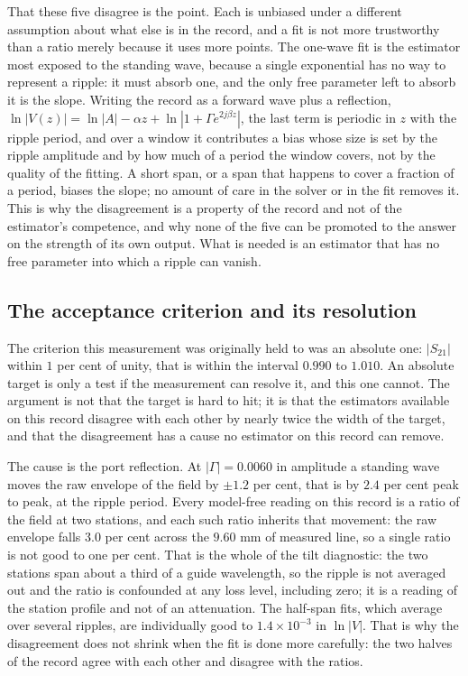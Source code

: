 That these five disagree is the point. Each is unbiased under a different assumption about what else is in the
record, and a fit is not more trustworthy than a ratio merely because it uses more points. The one-wave fit is
the estimator most exposed to the standing wave, because a single exponential has no way to represent a
ripple: it must absorb one, and the only free parameter left to absorb it is the slope. Writing the record as
a forward wave plus a reflection, $\ln|V(z)| = \ln|A| - \alpha z + \ln|1+\Gamma e^{2j\beta z}|$, the last
term is periodic in $z$ with the ripple period, and over a window it contributes a bias whose size is set by
the ripple amplitude and by how much of a period the window covers, not by the quality of the fitting. A short
span, or a span that happens to cover a fraction of a period, biases the slope; no amount of care in the
solver or in the fit removes it. This is why the disagreement is a property of the record and not of the
estimator's competence, and why none of the five can be promoted to the answer on the strength of its own
output. What is needed is an estimator that has no free parameter into which a ripple can vanish.

\subsection{The acceptance criterion and its resolution}
\label{sec:ms-criterion}

The criterion this measurement was originally held to was an absolute one: $|S_{21}|$ within $1$ per cent of
unity, that is within the interval $0.990$ to $1.010$. An absolute target is only a test if the measurement can
resolve it, and this one cannot. The argument is not that the target is hard to hit; it is that the estimators
available on this record disagree with each other by nearly twice the width of the target, and that the
disagreement has a cause no estimator on this record can remove.

The cause is the port reflection. At $|\Gamma| = 0.0060$ in amplitude a standing wave moves the raw envelope of
the field by $\pm 1.2$ per cent, that is by $2.4$ per cent peak to peak, at the ripple period. Every model-free
reading on this record is a ratio of the field at two stations, and each such ratio inherits that movement: the
raw envelope falls $3.0$ per cent across the $9.60$ mm of measured line, so a single ratio is not good to one per
cent. That is the whole of the tilt diagnostic: the two stations span about a third of a guide wavelength, so the
ripple is not averaged out and the ratio is confounded at any loss level, including zero; it is a reading of the
station profile and not of an attenuation. The half-span fits, which average over several ripples, are
individually good to $1.4\times 10^{-3}$ in $\ln|V|$. That is why the disagreement does not shrink when the fit is
done more carefully: the two halves of the record agree with each other and disagree with the ratios.

